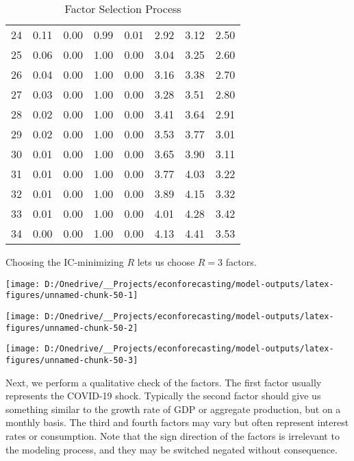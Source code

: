 \documentclass[11pt, letterpaper]{article}\usepackage[]{graphicx}\usepackage[]{color}
\begin{document}
\begin{table}[H]
\begin{tabular}{cccccccc}
   24 & 0.11 & 0.00 & 0.99 & 0.01 & 2.92 & 3.12 & 2.50 \\ 
   25 & 0.06 & 0.00 & 1.00 & 0.00 & 3.04 & 3.25 & 2.60 \\ 
   26 & 0.04 & 0.00 & 1.00 & 0.00 & 3.16 & 3.38 & 2.70 \\ 
   27 & 0.03 & 0.00 & 1.00 & 0.00 & 3.28 & 3.51 & 2.80 \\ 
   28 & 0.02 & 0.00 & 1.00 & 0.00 & 3.41 & 3.64 & 2.91 \\ 
   29 & 0.02 & 0.00 & 1.00 & 0.00 & 3.53 & 3.77 & 3.01 \\ 
   30 & 0.01 & 0.00 & 1.00 & 0.00 & 3.65 & 3.90 & 3.11 \\ 
   31 & 0.01 & 0.00 & 1.00 & 0.00 & 3.77 & 4.03 & 3.22 \\ 
   32 & 0.01 & 0.00 & 1.00 & 0.00 & 3.89 & 4.15 & 3.32 \\ 
   33 & 0.01 & 0.00 & 1.00 & 0.00 & 4.01 & 4.28 & 3.42 \\ 
   34 & 0.00 & 0.00 & 1.00 & 0.00 & 4.13 & 4.41 & 3.53 \\ 
   \hline
\end{tabular}
\endgroup
\caption{Factor Selection Process} 
\end{table}


Choosing the IC-minimizing $R$ lets us choose $R = 3$ factors.



{\centering \texttt{[image: D:/Onedrive/\_\_Projects/econforecasting/model-outputs/latex-figures/unnamed-chunk-50-1]} 

}




{\centering \texttt{[image: D:/Onedrive/\_\_Projects/econforecasting/model-outputs/latex-figures/unnamed-chunk-50-2]} 

}




{\centering \texttt{[image: D:/Onedrive/\_\_Projects/econforecasting/model-outputs/latex-figures/unnamed-chunk-50-3]} 

}




Next, we perform a qualitative check of the factors. The first factor usually represents the COVID-19 shock. Typically the second factor should give us something similar to the growth rate of GDP or aggregate production, but on a monthly basis. The third and fourth factors may vary but often represent interest rates or consumption. Note that the sign direction of the factors is irrelevant to the modeling process, and they may be switched negated without consequence. 
\end{document}
